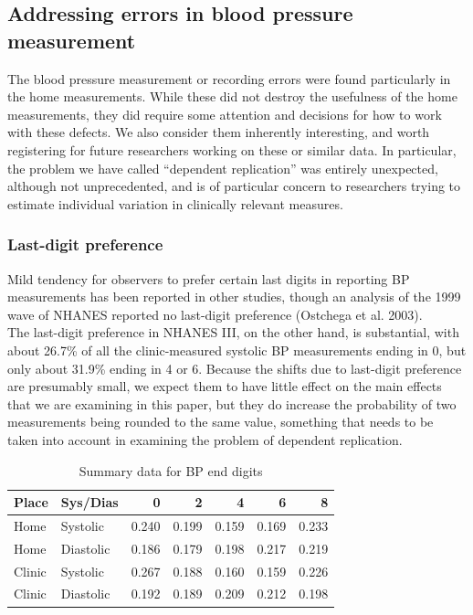 \documentclass[
]{article}
\begin{document}
\hypertarget{addressing-errors-in-blood-pressure-measurement}{%
\subsection{Addressing errors in blood pressure measurement}\label{addressing-errors-in-blood-pressure-measurement}}

The blood pressure measurement or recording errors were found particularly in the home measurements.
While these did not destroy the usefulness of the home measurements, they did require some attention and decisions for how to work with these defects.
We also consider them inherently interesting, and worth registering for future researchers working on these or similar data.
In particular, the problem we have called ``dependent replication'' was entirely unexpected, although not unprecedented, and is of particular concern to researchers trying to estimate individual variation in clinically relevant measures.

\hypertarget{sec:lastdigit}{%
\subsubsection{Last-digit preference}\label{sec:lastdigit}}

Mild tendency for observers to prefer certain last digits in reporting BP measurements has been reported in other studies, though an analysis of the 1999 wave of NHANES reported no last-digit preference (Ostchega et al. 2003).\\
The last-digit preference in NHANES III, on the other hand, is substantial, with about 26.7\% of all the clinic-measured systolic BP measurements ending in 0, but only about 31.9\% ending in 4 or 6. Because the shifts due to last-digit preference are presumably small, we expect them to have little effect on the main effects that we are examining in this paper, but they do increase the probability of two measurements being rounded to the same value, something that needs to be taken into account in examining the problem of dependent replication.

\begin{table}[!h]

\caption{\label{tab:digit-summary}Summary data for BP end digits}
\centering
\begin{tabular}[t]{llrrrrr}
\toprule
Place & Sys/Dias & 0 & 2 & 4 & 6 & 8\\
\midrule
Home & Systolic & 0.240 & 0.199 & 0.159 & 0.169 & 0.233\\
Home & Diastolic & 0.186 & 0.179 & 0.198 & 0.217 & 0.219\\
Clinic & Systolic & 0.267 & 0.188 & 0.160 & 0.159 & 0.226\\
Clinic & Diastolic & 0.192 & 0.189 & 0.209 & 0.212 & 0.198\\
\bottomrule
\end{tabular}
\end{table}
\end{document}
